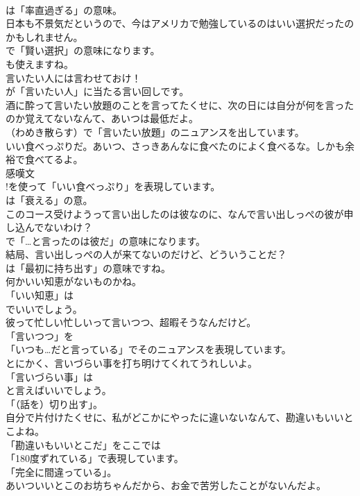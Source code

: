 \documentclass[8pt]{extreport}
\begin{document}
\begin{CJK}{UTF8}{min}
\\	は「率直過ぎる」の意味。	
\\	日本も不景気だというので、今はアメリカで勉強しているのはいい選択だったのかもしれません。 
\\	で「賢い選択」の意味になります。
\\	も使えますね。	
\\	言いたい人には言わせておけ！ 
\\	が「言いたい人」に当たる言い回しです。	
\\	酒に酔って言いたい放題のことを言ってたくせに、次の日には自分が何を言ったのか覚えてないなんて、あいつは最低だよ。 
\\	（わめき散らす）で「言いたい放題」のニュアンスを出しています。	
\\	いい食べっぷりだ。あいつ、さっきあんなに食べたのによく食べるな。しかも余裕で食べてるよ。 
\\	感嘆文
\\	!を使って「いい食べっぷり」を表現しています。
\\	は「衰える」の意。	
\\	このコース受けようって言い出したのは彼なのに、なんで言い出しっぺの彼が申し込んでないわけ？ 
\\	で「…と言ったのは彼だ」の意味になります。	
\\	結局、言い出しっぺの人が来てないのだけど、どういうことだ？ 
\\	は「最初に持ち出す」の意味ですね。	
\\	何かいい知恵がないものかね。 
\\	「いい知恵」は
\\	でいいでしょう。	
\\	彼って忙しい忙しいって言いつつ、超暇そうなんだけど。 
\\	「言いつつ」を
\\	「いつも…だと言っている」でそのニュアンスを表現しています。	
\\	とにかく、言いづらい事を打ち明けてくれてうれしいよ。 
\\	「言いづらい事」は
\\	と言えばいいでしょう。
\\	「（話を）切り出す」。	
\\	自分で片付けたくせに、私がどこかにやったに違いないなんて、勘違いもいいとこよね。 
\\	「勘違いもいいとこだ」をここでは
\\	「180度ずれている」で表現しています。
\\	「完全に間違っている」。	
\\	あいついいとこのお坊ちゃんだから、お金で苦労したことがないんだよ。 

\end{CJK}
\end{document}
